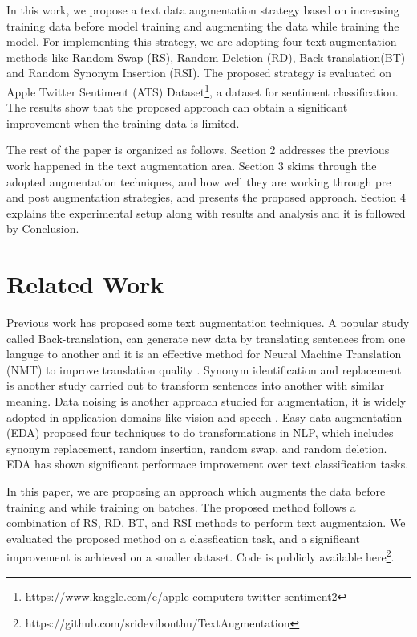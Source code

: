 \documentclass{article}
\begin{document}
In this work, we propose a text data augmentation strategy based on increasing training data before model training and augmenting the data while training the model. For implementing this strategy, we are adopting four text augmentation methods like Random Swap (RS), Random Deletion (RD), Back-translation(BT) and Random Synonym Insertion (RSI). The proposed strategy is evaluated on Apple Twitter Sentiment (ATS) Dataset\footnote{https://www.kaggle.com/c/apple-computers-twitter-sentiment2}, a dataset for sentiment classification. The results show that the proposed approach can obtain a significant improvement when the training data is limited.

The rest of the paper is organized as follows. Section 2 addresses the previous work happened in the text augmentation area. Section 3 skims through the adopted augmentation techniques, and how well they are working through pre and post augmentation strategies, and presents the proposed approach. Section 4 explains the experimental setup along with results and analysis and it is followed by Conclusion.


\section{Related Work}
Previous work has proposed some text augmentation techniques. A popular study called Back-translation, can generate new data by translating sentences from one languge to another and it is an effective method for Neural Machine Translation (NMT) to improve translation quality \cite{fadaee2018back}. Synonym identification and replacement \cite{anders2020dynamic} is another study carried out to transform sentences into another with similar meaning. Data noising is another approach studied for augmentation, it is widely adopted in application domains like vision and speech \cite{xie2017data}. Easy data augmentation (EDA)\cite{wei2019eda} proposed four techniques to do transformations in NLP, which includes synonym replacement, random insertion, random swap, and random deletion. EDA has shown significant performace improvement over text classification tasks.

In this paper, we are proposing an approach which augments the data before training and while training on batches. The proposed method follows a combination of RS, RD, BT, and RSI methods to perform text augmentaion. We evaluated the proposed method on a classfication task, and a significant improvement is achieved on a smaller dataset. Code is publicly available here\footnote{https://github.com/sridevibonthu/TextAugmentation}.
\end{document}
